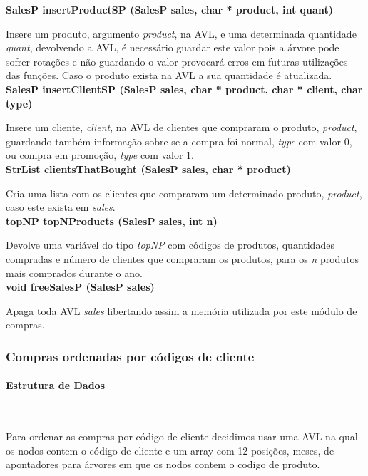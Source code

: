 \documentclass[10pt] {article}
\begin{document}
\noindent \textbf {SalesP insertProductSP (SalesP sales, char * product, int quant)}
\par Insere um produto, argumento \emph{product}, na AVL, e uma determinada quantidade \emph{quant}, 
devolvendo a AVL, é necessário guardar este valor pois a árvore pode sofrer rotações e não guardando o valor 
provocará erros em futuras utilizações das funções. Caso o produto exista na AVL a sua quantidade é atualizada.\\

\noindent \textbf {SalesP insertClientSP (SalesP sales, char * product, char * client, char type)}
\par Insere um cliente, \emph{client}, na AVL de clientes que compraram o produto, \emph{product}, guardando 
também informação sobre se a compra foi normal, \emph{type} com valor 0, ou compra em promoção, 
\emph{type} com valor 1.\\

\noindent \textbf {StrList clientsThatBought (SalesP sales, char * product)}
\par Cria uma lista com os clientes que compraram um determinado produto, \emph{product}, caso este exista em
\emph{sales}.\\

\noindent \textbf {topNP topNProducts (SalesP sales, int n)}
\par Devolve uma variável do tipo \emph{topNP} com códigos de produtos, quantidades compradas e número de 
clientes que compraram os produtos, para os \emph{n} produtos mais comprados durante o ano.\\

\noindent \textbf {void freeSalesP (SalesP sales)}
\par Apaga toda AVL \emph{sales} libertando assim a memória utilizada por este módulo de compras.\\

\newpage
\subsubsection{Compras ordenadas por códigos de cliente}
\paragraph{Estrutura de Dados}\mbox{}\\
\indent\par Para ordenar as compras por código de cliente decidimos usar uma AVL na qual os nodos contem 
o código de cliente e um array com 12 posições, meses, de apontadores para árvores em que os nodos 
contem o codigo de produto.
\end{document}
